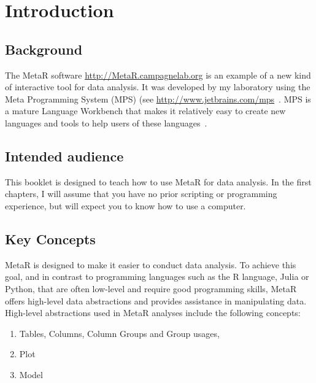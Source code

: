 


\chapter{Introduction}\label{chap:Introduction}
\section{Background}
The MetaR software \url{http://MetaR.campagnelab.org} is an example of a new kind of interactive tool for data analysis. It was developed by my laboratory using the Meta Programming System (MPS) (see \url{http://www.jetbrains.com/mps}~\cite{Dmitriev:2004}. MPS is a mature Language Workbench that makes it relatively easy to create new languages and tools to help users of these languages~\cite{campagne2014mps}. 

\section{Intended audience}
This booklet is designed to teach how to use MetaR for data analysis. In the first chapters, I will assume that you have no prior scripting or programming experience, but will expect you to know how to use a computer.


\section{Key Concepts}
MetaR is designed to make it easier to conduct data analysis. To achieve this goal, and in contrast to programming languages such as the R language, Julia or Python, that are often low-level and require good programming skills, MetaR offers high-level data abstractions and provides assistance in manipulating data. High-level abstractions used in MetaR analyses include the following concepts:

\begin{enumerate}
	\item Tables, Columns, Column Groups and Group usages,
	\item Plot
	\item Model
\end{enumerate}


